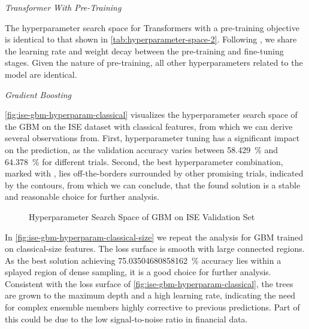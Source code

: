 \emph{Transformer With Pre-Training}

The hyperparameter search space for Transformers with a pre-training objective is identical to that shown in \cref{tab:hyperparameter-space-2}. Following \textcite[][4]{rubachevRevisitingPretrainingObjectives2022}, we share the learning rate and weight decay between the pre-training and fine-tuning stages. Given the nature of pre-training, all other hyperparameters related to the model are identical.


\emph{Gradient Boosting}

\cref{fig:ise-gbm-hyperparam-classical} visualizes the hyperparameter search space of the \gls{GBM} on the \gls{ISE} dataset with classical features, from which we can derive several observations from. First, hyperparameter tuning has a significant impact on the prediction, as the validation accuracy varies between \SI{58.429}{\percent} and \SI{64.378}{\percent} for different trials. Second, the best hyperparameter combination, marked with \bestcircle, lies off-the-borders surrounded by other promising trials, indicated by the contours, from which we can conclude, that the found solution is a stable and reasonable choice for further analysis.


\begin{figure}[!b]
    \vfill
\end{figure}
\clearpage
\begin{figure}[ht]
    \addtocounter{figure}{-1}
    \caption[]{Hyperparameter Search Space of \gls{GBM} on \gls{ISE} Validation Set}
    \label{fig:ise-gbm-hyperparam}
\end{figure}

In \cref{fig:ise-gbm-hyperparam-classical-size} we repeat the analysis for \gls{GBM} trained on classical-size features. The loss surface is smooth with large connected regions. As the best solution achieving \SI{75.03504680858162}{\percent} accuracy lies within a splayed region of dense sampling, it is a good choice for further analysis. Consistent with the loss surface of \cref{fig:ise-gbm-hyperparam-classical}, the trees are grown to the maximum depth and a high learning rate, indicating the need for complex ensemble members highly corrective to previous predictions. Part of this could be due to the low signal-to-noise ratio in financial data.

